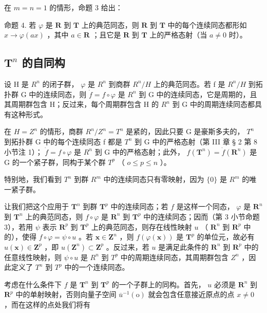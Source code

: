 在 \(m = n = 1\) 的情形，命题 3 给出：

命题 4. 若 \(\varphi\) 是 \(\mathbf{R}\) 到 \(\mathbf{T}\) 上的典范同态，则 \(\mathbf{R}\) 到 \(\mathbf{T}\) 中的每个连续同态都形如 \(x \to \varphi(ax)\) ，其中 \(a \in \mathbf{R}\) ；且它是 \(\mathbf{R}\) 到 \(\mathbf{T}\) 上的严格态射（当 \(a \neq 0\) 时）。

\subsection{\texorpdfstring{\(\mathbf{T}^n\) 的自同构}{T 的 n 次幂的自同构}}

设 H 是 \(R^{n}\) 的闭子群， \(\varphi\) 是 \(R^{n}\) 到商群 \(R^{n}/H\) 上的典范同态。若 f 是 \(R^{n}/H\) 到拓扑群 G 中的连续同态，则 \(\dot{f} = f \circ \varphi\) 是 \(R^{n}\) 到 G 中的连续同态，它是周期的，且其周期群包含 H；反过来，每个周期群包含 H 的 \(R^{n}\) 到 G 中的周期连续同态都具有这种形式。

在 \(H = Z^{n}\) 的情形，商群 \(R^{n}/Z^{n} = T^{n}\) 是紧的，因此只要 G 是豪斯多夫的， \(T^{n}\) 到拓扑群 G 中的每个连续同态 f 都是 \(T^{n}\) 到 G 中的严格态射（第 III 章 § 2 第 8 小节注 1）； \(\dot{f} = f \circ \varphi\) 是 \(R^{n}\) 到 G 中的严格态射；此外， \(f(\mathbf{T}^{n}) = \dot{f}(\mathbf{R}^{n})\) 是 G 的一个紧子群，同构于某个群 \(T^{p}\) （ \(o \leqslant p \leqslant n\) ）。

特别地，我们看到 \(T^{n}\) 到群 \(R^{m}\) 中的连续同态只有零映射，因为 \(\{0\}\) 是 \(R^{m}\) 的唯一紧子群。

让我们把这个应用于 \(\mathbf{T}^n\) 到群 \(\mathbf{T}^p\) 中的连续同态；若 \(f\) 是这样一个同态， \(\varphi\) 是 \(\mathbf{R}^n\) 到 \(\mathbf{T}^n\) 上的典范同态，则 \(f \circ \varphi\) 是 \(\mathbf{R}^n\) 到 \(\mathbf{T}^p\) 中的连续同态；因而（第 3 小节命题 3），若用 \(\psi\) 表示 \(\mathbf{R}^p\) 到 \(\mathbf{T}^p\) 上的典范同态，则存在线性映射 \(u\) （ \(\mathbf{R}^n\) 到 \(\mathbf{R}^p\) 中的），使得 \(f \circ \varphi = \psi \circ u\) 。若 \(\boldsymbol{x} \in \mathbf{Z}^n\) ，则 \(f(\varphi(\boldsymbol{x}))\) 是 \(\mathbf{T}^p\) 的单位元，故必有 \(u(\boldsymbol{x}) \in \mathbf{Z}^p\) ，即 \(u(\mathbf{Z}^n) \subset \mathbf{Z}^p\) 。反过来，若 \(u\) 是满足此条件的 \(\mathbf{R}^n\) 到 \(\mathbf{R}^p\) 中的任意线性映射，则 \(\psi \circ u\) 是 \(R^n\) 到 \(T^p\) 中的周期连续同态，其周期群包含 \(Z^n\) ，因此定义了 \(T^n\) 到 \(T^p\) 中的一个连续同态。

考虑在什么条件下 \(f\) 是 \(\mathbf{T}^n\) 到 \(\mathbf{T}^p\) 的一个子群上的同构。首先， \(u\) 必须是 \(\mathbf{R}^n\) 到 \(\mathbf{R}^p\) 中的单射映射，否则向量子空间 \(\overline{u}^{-1}(\mathrm{o})\) 就会包含任意接近原点的点 \(x \neq 0\) ，而在这样的点处我们将有


